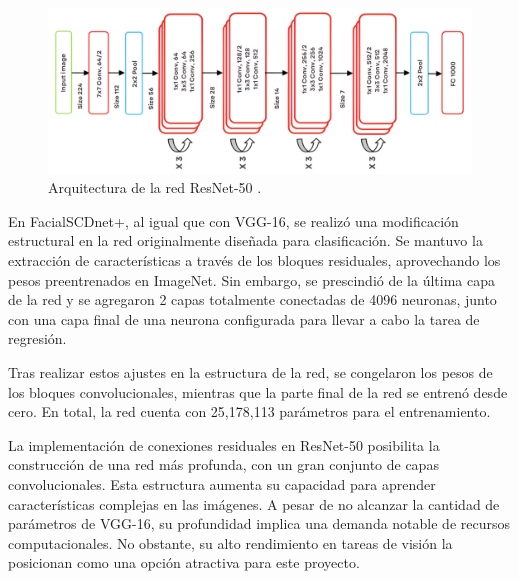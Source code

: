 \begin{figure}[h]
	\centering
	\includegraphics[scale=0.12]{imagenes/cap4/resnet.png}
	\caption[Arquitectura de la red ResNet-50.]{Arquitectura de la red ResNet-50 \cite{73}.}
	\label{fig29}
\end{figure}

En FacialSCDnet+, al igual que con VGG-16, se realizó una modificación estructural en la red originalmente diseñada para clasificación. Se mantuvo la extracción de características a través de los bloques residuales, aprovechando los pesos preentrenados en ImageNet. Sin embargo, se prescindió de la última capa de la red y se agregaron 2 capas totalmente conectadas de 4096 neuronas, junto con una capa final de una neurona configurada para llevar a cabo la tarea de regresión.

Tras realizar estos ajustes en la estructura de la red, se congelaron los pesos de los bloques convolucionales, mientras que la parte final de la red se entrenó desde cero. En total, la red cuenta con 25,178,113 parámetros para el entrenamiento.

La implementación de conexiones residuales en ResNet-50 posibilita la construcción de una red más profunda, con un gran conjunto de capas convolucionales. Esta estructura aumenta su capacidad para aprender características complejas en las imágenes. A pesar de no alcanzar la cantidad de parámetros de VGG-16, su profundidad implica una demanda notable de recursos computacionales. No obstante, su alto rendimiento en tareas de visión la posicionan como una opción atractiva para este proyecto.